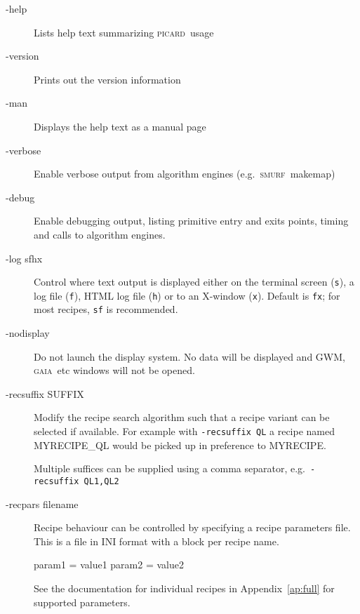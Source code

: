 \documentclass[twoside,11pt,nolof]{starlink}
\providecommand{\GAIA}{\textsc{gaia}}
\providecommand{\SMURF}{\textsc{smurf}}
\providecommand{\picard}{\textsc{picard}}
\providecommand{\task}[1]{\textsf{#1}}
\begin{document}
\begin{description}
\item[-help] \mbox{}

  Lists help text summarizing \picard\ usage

\item[-version] \mbox{}

  Prints out the version information

\item[-man] \mbox{}

  Displays the help text as a manual page

\item[-verbose] \mbox{}

  Enable verbose output from algorithm engines (e.g.\ \SMURF\ \task{makemap})

\item[-debug] \mbox{}

  Enable debugging output, listing primitive entry and exits points,
  timing and calls to algorithm engines.

\item[-log sfhx] \mbox{}

  Control where text output is displayed either on the terminal screen
  (\texttt{s}), a log file (\texttt{f}), HTML log file (\texttt{h}) or
  to an X-window (\texttt{x}). Default is \texttt{fx}; for most
  recipes, \texttt{sf} is recommended.

\item[-nodisplay] \mbox{}

  Do not launch the display system. No data will be displayed and GWM,
  \GAIA\ etc windows will not be opened.

\item[-recsuffix SUFFIX] \mbox{}

  Modify the recipe search algorithm such that a recipe variant can be
  selected if available. For example with \texttt{-recsuffix QL} a
  recipe named \task{MYRECIPE\_QL} would be picked up in preference to
  \task{MYRECIPE}.

  Multiple suffices can be supplied using a comma separator, e.g.\
  \texttt{-recsuffix QL1,QL2}

\item[-recpars filename] \mbox{}

  Recipe behaviour can be controlled by specifying a recipe parameters
  file. This is a file in INI format with a block per recipe name.
\begin{terminalv}
param1 = value1
param2 = value2
\end{terminalv}
See the documentation for individual recipes in Appendix~\ref{ap:full}
for supported parameters.

\end{description}
\end{document}
